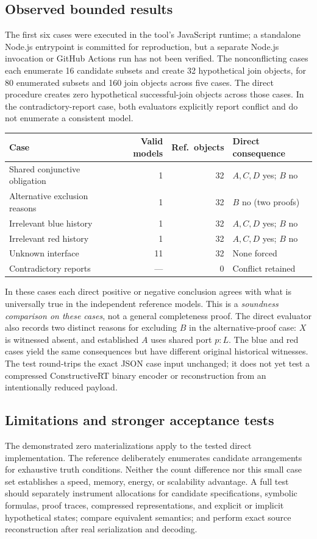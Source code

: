 \documentclass[11pt]{article}
\begin{document}
\subsection{Observed bounded results}
The first six cases were executed in the tool's
JavaScript runtime; a standalone Node.js entrypoint
is committed for reproduction, but a separate Node.js
invocation or GitHub Actions run has not been verified.
The nonconflicting cases each enumerate 16 candidate
subsets and create 32 hypothetical join objects,
for 80 enumerated subsets and 160 join objects
across five cases. The direct procedure creates
zero hypothetical successful-join objects across
those cases. In the contradictory-report case,
both evaluators explicitly report conflict and
do not enumerate a consistent model.

\begin{center}
\begin{tabular}{lrrl}
\hline
Case & Valid models & Ref.\ objects & Direct consequence\\
\hline
Shared conjunctive obligation & 1 & 32 & $A,C,D$ yes; $B$ no\\
Alternative exclusion reasons & 1 & 32 & $B$ no (two proofs)\\
Irrelevant blue history & 1 & 32 & $A,C,D$ yes; $B$ no\\
Irrelevant red history & 1 & 32 & $A,C,D$ yes; $B$ no\\
Unknown interface & 11 & 32 & None forced\\
Contradictory reports & --- & 0 & Conflict retained\\
\hline
\end{tabular}
\end{center}

In these cases each direct positive or negative
conclusion agrees with what is universally true
in the independent reference models. This is a
\emph{soundness comparison on these cases}, not a
general completeness proof. The direct evaluator
also records two distinct reasons for excluding
$B$ in the alternative-proof case: $X$ is witnessed
absent, and established $A$ uses shared port $p{:}L$.
The blue and red cases yield the same consequences
but have different original historical witnesses.
The test round-trips the exact JSON case input
unchanged; it does not yet test a compressed
ConstructiveRT binary encoder or reconstruction
from an intentionally reduced payload.

\subsection{Limitations and stronger acceptance tests}
The demonstrated zero materializations apply to
the tested direct implementation. The reference
deliberately enumerates candidate arrangements
for exhaustive truth conditions. Neither the
count difference nor this small case set
establishes a speed, memory, energy, or scalability
advantage. A full test should separately
instrument allocations for candidate specifications,
symbolic formulas, proof traces, compressed
representations, and explicit or implicit
hypothetical states; compare equivalent semantics;
and perform exact source reconstruction after
real serialization and decoding.
\end{document}
